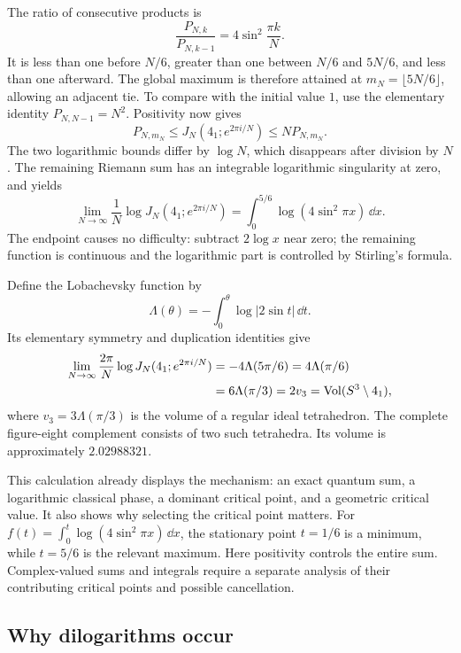 The ratio of consecutive products is
\[
 \frac{P_{N,k}}{P_{N,k-1}}=4\sin^2\frac{\pi k}{N}.
\]
It is less than one before $N/6$, greater than one between $N/6$
and $5N/6$, and less than one afterward. The global maximum is
therefore attained at $m_N=\lfloor5N/6\rfloor$, allowing an adjacent
tie. To compare with the initial value $1$, use the elementary
identity $P_{N,N-1}=N^2$. Positivity now gives
\[
 P_{N,m_N}\le J_N(4_1;e^{2\pi i/N})\le N P_{N,m_N}.
\]
The two logarithmic bounds differ by $\log N$, which disappears
after division by $N$. The remaining Riemann sum has an integrable
logarithmic singularity at zero, and yields
\begin{equation}
 \lim_{N\to\infty}\frac1N\log J_N(4_1;e^{2\pi i/N})
 =\int_0^{5/6}\log(4\sin^2\pi x)\,\dd x.
 \label{eq:introfigureintegral}
\end{equation}
The endpoint causes no difficulty: subtract $2\log x$ near zero;
the remaining function is continuous and the logarithmic part is
controlled by Stirling's formula.

Define the Lobachevsky function by
\[
 \Lambda(\theta)=-\int_0^\theta\log|2\sin t|\,\dd t.
\]
Its elementary symmetry and duplication identities give
\begin{align}
 \lim_{N\to\infty}\frac{2\pi}{N}
       \log J_N(4_1;e^{2\pi i/N})
 &=-4\Lambda(5\pi/6)=4\Lambda(\pi/6)\notag\\
 &=6\Lambda(\pi/3)=2v_3
  =\operatorname{Vol}(S^3\setminus4_1),
 \label{eq:introfigurevolume}
\end{align}
where $v_3=3\Lambda(\pi/3)$ is the volume of a regular ideal
tetrahedron. The complete figure-eight complement consists of two
such tetrahedra. Its volume is approximately $2.02988321$.

This calculation already displays the mechanism: an exact quantum
sum, a logarithmic classical phase, a dominant critical point,
and a geometric critical value. It also shows why selecting the
critical point matters. For
$f(t)=\int_0^t\log(4\sin^2\pi x)\,\dd x$, the stationary point
$t=1/6$ is a minimum, while $t=5/6$ is the relevant maximum.
Here positivity controls the entire sum. Complex-valued sums and
integrals require a separate analysis of their contributing
critical points and possible cancellation.

\subsection{Why dilogarithms occur}
\label{sec:introdilog}

